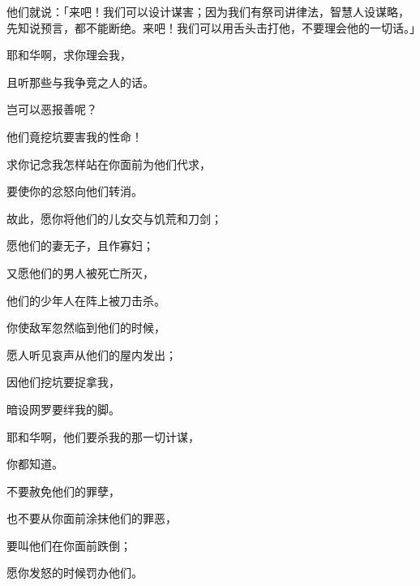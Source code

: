 {\par }{\PP {}他们就说：「来吧！我们可以设计谋害{}；因为我们有祭司讲律法，智慧人设谋略，先知说预言，都不能断绝。来吧！我们可以用舌头击打他，不要理会他的一切话。」
\par }{\Q {}耶和华啊，求你理会我，
\par }{\Q 且听那些与我争竞之人的话。
\par }{\Q {}岂可以恶报善呢？
\par }{\Q 他们竟挖坑要害我的性命！
\par }{\Q 求你记念我怎样站在你面前为他们代求，
\par }{\Q 要使你的忿怒向他们转消。
\par }{\Q {}故此，愿你将他们的儿女交与饥荒和刀剑；
\par }{\Q 愿他们的妻无子，且作寡妇；
\par }{\Q 又愿他们的男人被死亡所灭，
\par }{\Q 他们的少年人在阵上被刀击杀。
\par }{\Q {}你使敌军忽然临到他们的时候，
\par }{\Q 愿人听见哀声从他们的屋内发出；
\par }{\Q 因他们挖坑要捉拿我，
\par }{\Q 暗设网罗要绊我的脚。
\par }{\Q {}耶和华啊，他们要杀我的那一切计谋，
\par }{\Q 你都知道。
\par }{\Q 不要赦免他们的罪孽，
\par }{\Q 也不要从你面前涂抹他们的罪恶，
\par }{\Q 要叫他们在你面前跌倒；
\par }{\Q 愿你发怒的时候罚办他们。

}
